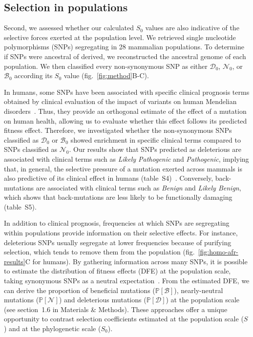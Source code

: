 \documentclass[12pt]{article}
\newcommand{\proba}{\mathbb{P}}
\newcommand{\Sphy}{S_{0}}
\newcommand{\SphyDel}{\mathcal{D}_0}
\newcommand{\SphyNeu}{\mathcal{N}_0}
\newcommand{\SphyBen}{\mathcal{B}_0}
\newcommand{\Spop}{S}
\newcommand{\SpopDel}{\mathcal{D}}
\newcommand{\SpopNeu}{\mathcal{N}}
\newcommand{\SpopBen}{\mathcal{B}}
\newcommand{\ProbaPopDel}{\proba [ \SpopDel]}
\newcommand{\ProbaPopNeu}{\proba [ \SpopNeu ]}
\newcommand{\ProbaPopBen}{\proba [ \SpopBen ]}
\begin{document}
\subsection*{Selection in populations}
Second, we assessed whether our calculated $\Sphy$ values are also indicative of the selective forces exerted at the population level.
We retrieved single nucleotide polymorphisms (SNPs) segregating in 28 mammalian populations.
To determine if SNPs were ancestral of derived, we reconstructed the ancestral genome of each population.
We then classified every non-synonymous SNP as either $\SphyDel$, $\SphyNeu$, or $\SphyBen$ according its $\Sphy$ value (fig.~\ref{fig:method}B-C).

In humans, some SNPs have been associated with specific clinical prognosis terms obtained by clinical evaluation of the impact of variants on human Mendelian disorders~\cite{landrum_clinvar_2018}.
Thus, they provide an orthogonal estimate of the effect of a mutation on human health, allowing us to evaluate whether this effect follows its predicted fitness effect.
Therefore, we investigated whether the non-synonymous SNPs classified as $\SphyDel$ or $\SphyBen$ showed enrichment in specific clinical terms compared to SNPs classified as $\SphyNeu$.
Our results show that SNPs predicted as deleterious are associated with clinical terms such as \textit{Likely Pathogenic} and \textit{Pathogenic}, implying that, in general, the selective pressure of a mutation exerted across mammals is also predictive of its clinical effect in humans (table~S4)~\cite{sullivan_leveraging_2023}.
Conversely, back-mutations are associated with clinical terms such as \textit{Benign} and \textit{Likely Benign}, which shows that back-mutations are less likely to be functionally damaging (table~S5).

In addition to clinical prognosis, frequencies at which SNPs are segregating within populations provide information on their selective effects.
For instance, deleterious SNPs usually segregate at lower frequencies because of purifying selection, which tends to remove them from the population (fig.~\ref{fig:homo-afr-results}C for humans).
By gathering information across many SNPs, it is possible to estimate the distribution of fitness effects (DFE) at the population scale, taking synonymous SNPs as a neutral expectation~\cite{eyre-walker_distribution_2006, eyre-walker_estimating_2009, galtier_adaptive_2016, tataru_inference_2017}.
From the estimated DFE, we can derive the proportion of beneficial mutations ($\ProbaPopBen$), nearly-neutral mutations ($\ProbaPopNeu$) and deleterious mutations ($\ProbaPopDel$) at the population scale (see section~1.6 in Materials \& Methods).
These approaches offer a unique opportunity to contrast selection coefficients estimated at the population scale ($\Spop$) and at the phylogenetic scale ($\Sphy$).
\end{document}
